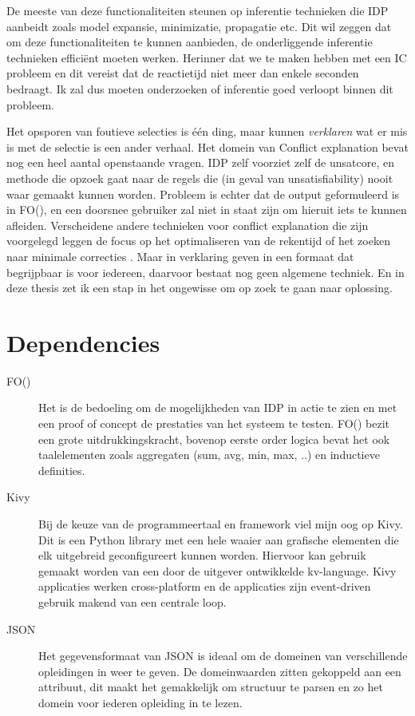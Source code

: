 De meeste van deze functionaliteiten steunen op inferentie technieken die IDP aanbeidt zoals model expansie, minimizatie, propagatie etc. Dit wil zeggen dat om deze functionaliteiten te kunnen aanbieden, de onderliggende inferentie technieken effici\"{e}nt moeten werken. Herinner dat we te maken hebben met een IC probleem en dit vereist dat de reactietijd niet meer dan enkele seconden bedraagt. Ik zal dus moeten onderzoeken of inferentie goed verloopt binnen dit probleem.

Het opsporen van foutieve selecties is \'{e}\'{e}n ding, maar kunnen \emph{verklaren} wat er mis is met de selectie is een ander verhaal. 
Het domein van Conflict explanation bevat nog een heel aantal openstaande vragen. IDP zelf voorziet zelf de unsatcore, en methode die opzoek gaat naar de regels die (in geval van unsatisfiability) nooit waar gemaakt kunnen worden. Probleem is echter dat de output geformuleerd is in FO(\textperiodcentered), en een doorsnee gebruiker zal niet in staat zijn om hieruit iets te kunnen afleiden. Verscheidene andere technieken voor conflict explanation die zijn voorgelegd leggen de focus op het optimaliseren van de rekentijd \citep{amilhastre2002consistency} of het zoeken naar minimale correcties \citep{o2005generating}. Maar in verklaring geven in een formaat dat begrijpbaar is voor iedereen, daarvoor bestaat nog geen algemene techniek. En in deze thesis zet ik een stap in het ongewisse om op zoek te gaan naar oplossing.


\section{Dependencies}
\begin{description}
\item [FO(\textperiodcentered)] Het is de bedoeling om de mogelijkheden van IDP in actie te zien en met een proof of concept de prestaties van het systeem te testen. FO(\textperiodcentered) bezit een grote uitdrukkingskracht, bovenop eerste order logica bevat het ook taalelementen zoals aggregaten (sum, avg, min, max, ..) en inductieve definities. 
\item [Kivy] Bij de keuze van de programmeertaal en framework viel mijn oog op Kivy. Dit is een Python library met een hele waaier aan grafische elementen die elk uitgebreid geconfigureert kunnen worden. Hiervoor kan gebruik gemaakt worden van een door de uitgever ontwikkelde kv-language. Kivy applicaties werken cross-platform en de applicaties zijn event-driven gebruik makend van een centrale loop.
\item [JSON] Het gegevensformaat van JSON is ideaal om de domeinen van verschillende opleidingen in weer te geven. De domeinwaarden zitten gekoppeld aan een attribuut, dit maakt het gemakkelijk om structuur te parsen en zo het domein voor iederen opleiding in te lezen.
\end{description}